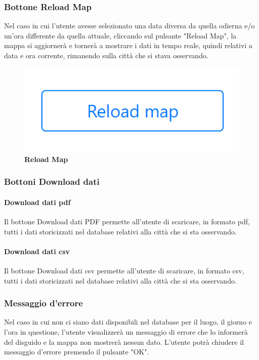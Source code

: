 \subsubsection{Bottone Reload Map} \label{UtilizzoDiGDPGatheringDetecionPlatformContenutoCentralePaginaInizialeHomeBottoneReloadMap}
Nel caso in cui l'utente avesse selezionato una data diversa da quella odierna e/o un'ora differente da quella attuale, cliccando sul pulsante "Reload Map", la mappa si aggiornerà e tornerà a mostrare i dati in tempo reale, quindi relativi a data e ora corrente, rimanendo sulla città che si stava osservando.
\begin{center}
	\begin{figure}[H]
		\centering\includegraphics[width=0.3\linewidth]{../immagini/manualeUtente/ReloadMap.png}
		\caption{\textbf{Reload Map}}
	\end{figure}
\end{center}

\subsubsection{Bottoni Download dati} \label{UtilizzoDiGDPGatheringDetecionPlatformContenutoCentralePaginaInizialeHomeBottoneDownloadDati}
\paragraph{Download dati pdf}
Il bottone Download dati PDF permette all'utente di scaricare, in formato pdf, tutti i dati storicizzati nel database relativi alla città che si sta osservando.

\paragraph{Download dati csv}
Il bottone Download dati csv permette all'utente di scaricare, in formato csv, tutti i dati storicizzati nel database relativi alla città che si sta osservando.

\subsubsection{Messaggio d'errore} \label{UtilizzoDiGDPGatheringDetecionPlatformContenutoCentralePaginaInizialeHomeMessaggioDiErrore}
Nel caso in cui non ci siano dati disponibili nel database per il luogo, il giorno e l'ora in questione, l'utente visualizzerà un messaggio di errore che lo informerà del disguido e la mappa non mostrerà nessun dato. L'utente potrà chiudere il messaggio d'errore premendo il pulsante "OK".


